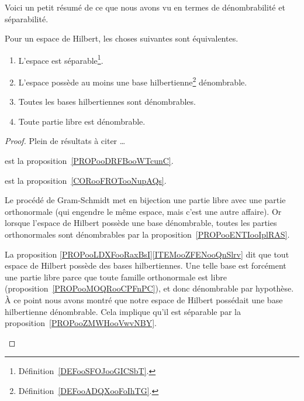 Voici un petit résumé de ce que nous avons vu en termes de dénombrabilité et séparabilité.
\begin{theorem}     \label{THOooMKNFooVrCNGA}
	Pour un espace de Hilbert, les choses suivantes sont équivalentes.
	\begin{enumerate}
		\item       \label{ITEMooSJKVooFIIbwg}
		      L'espace est séparable\footnote{Définition~\ref{DEFooSFOJooGICSbT}.}.
		\item       \label{ITEMooQIZLooYdtYqF}
		      L'espace possède au moins une base hilbertienne\footnote{Définition~\ref{DEFooADQXooFoIhTG}.} dénombrable.
		\item       \label{ITEMooHYSXooOubwUy}
		      Toutes les bases hilbertiennes sont dénombrables.
		\item       \label{ITEMooMZICooNBAVum}
		      Toute partie libre est dénombrable.
	\end{enumerate}
\end{theorem}

\begin{proof}
	Plein de résultats à citer \ldots
	\begin{subproof}

		est la proposition~\ref{PROPooDRFBooWTcunC}.


		est la proposition~\ref{CORooFROTooNupAQs}.



		Le procédé de Gram-Schmidt met en bijection une partie libre avec une partie orthonormale (qui engendre le même espace, mais c'est une autre affaire). Or lorsque l'espace de Hilbert possède une base dénombrable, toutes les parties orthonormales sont dénombrables par la proposition~\ref{PROPooENTIooIplRAS}.

		La proposition \ref{PROPooLDXFooRaxBsI}\ref{ITEMooZFENooQnSlrv} dit que tout espace de Hilbert possède des bases hilbertiennes. Une telle base est forcément une partie libre parce que toute famille orthonormale est libre (proposition~\ref{PROPooMOQRooCPFnPC}), et donc dénombrable par hypothèse. À ce point nous avons montré que notre espace de Hilbert possédait une base hilbertienne dénombrable. Cela implique qu'il est séparable par la proposition~\ref{PROPooZMWHooVwvNBY}.
	\end{subproof}
\end{proof}

